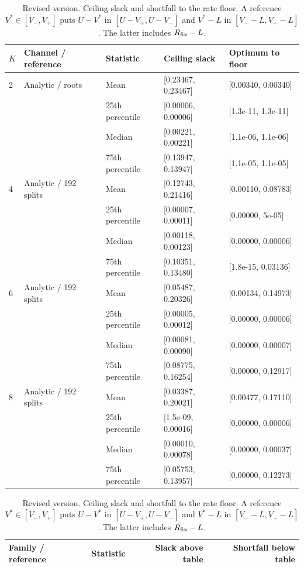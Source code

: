 \documentclass[10pt,letterpaper]{article}
\begin{document}
\begin{table}[p]\color{blue}\centering\small
\setlength{\tabcolsep}{4pt}
\caption{Revised version. Ceiling slack and shortfall to the rate floor. A reference $V^*\in[V_-,V_+]$ puts $U-V^*$ in $[U-V_+,U-V_-]$ and $V^*-L$ in $[V_--L,V_+-L]$. The latter includes $R_{\rm fix}-L$.}\label{supp:decomposition}
\begin{tabular}{lllll}\toprule
$K$ & Channel / reference & Statistic & Ceiling slack & Optimum to floor\\
\midrule
2 & Analytic / roots & Mean & [0.23467, 0.23467] & [0.00340, 0.00340]\\
 &  & 25th percentile & [0.00006, 0.00006] & [1.3e-11, 1.3e-11]\\
 &  & Median & [0.00221, 0.00221] & [1.1e-06, 1.1e-06]\\
 &  & 75th percentile & [0.13947, 0.13947] & [1.1e-05, 1.1e-05]\\
4 & Analytic / 192 splits & Mean & [0.12743, 0.21416] & [0.00110, 0.08783]\\
 &  & 25th percentile & [0.00007, 0.00011] & [0.00000, 5e-05]\\
 &  & Median & [0.00118, 0.00123] & [0.00000, 0.00006]\\
 &  & 75th percentile & [0.10351, 0.13480] & [1.8e-15, 0.03136]\\
6 & Analytic / 192 splits & Mean & [0.05487, 0.20326] & [0.00134, 0.14973]\\
 &  & 25th percentile & [0.00005, 0.00012] & [0.00000, 0.00006]\\
 &  & Median & [0.00081, 0.00090] & [0.00000, 0.00007]\\
 &  & 75th percentile & [0.08775, 0.16254] & [0.00000, 0.12917]\\
8 & Analytic / 192 splits & Mean & [0.03387, 0.20021] & [0.00477, 0.17110]\\
 &  & 25th percentile & [1.5e-09, 0.00016] & [0.00000, 0.00006]\\
 &  & Median & [0.00010, 0.00078] & [0.00000, 0.00037]\\
 &  & 75th percentile & [0.05753, 0.13957] & [0.00000, 0.12273]\\
\bottomrule\end{tabular}
\par\medskip\begin{minipage}{\linewidth}\small
\par\smallskip\noindent\begin{tabular}{llrr}\toprule Family / reference & Statistic & Slack above table & Shortfall below table\\\midrule

\end{tabular}
\end{minipage}
\end{table}
\end{document}
